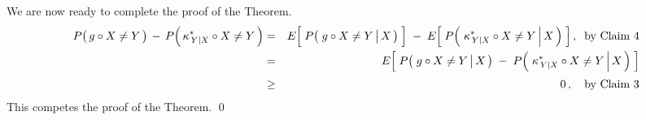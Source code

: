\vskip 0.8cm
\noindent
We are now ready to complete the proof of the Theorem.
\begin{eqnarray*}
P\!\left(\,g\overset{{\color{white}.}}{\circ}X \neq Y\,\right) \,-\, P\!\left(\,\kappa^{*}_{\,Y \vert X}\overset{{\color{white}.}}{\circ}X \neq Y\,\right)
&=&
	E\!\left[\;\overset{{\color{white}.}}{P}\!\left(\,\left. g \overset{{\color{white}.}}{\circ} X \neq Y \,\right\vert X \,\right)\;\right]
	\; - \;
	E\!\left[\;\overset{{\color{white}.}}{P}\!\left(\,\left. \kappa^{*}_{\,Y \vert X} \overset{{\color{white}.}}{\circ} X \neq Y \,\right\vert X \,\right)\;\right],
	\;\;\textnormal{by Claim 4}
\\
&=&
	E\!\left[\;
		\overset{{\color{white}.}}{P}\!\left(\,\left. g \overset{{\color{white}.}}{\circ} X \neq Y \,\right\vert X \,\right)
		\; - \;
		\overset{{\color{white}.}}{P}\!\left(\,\left. \kappa^{*}_{\,Y \vert X} \overset{{\color{white}.}}{\circ} X \neq Y \,\right\vert X \,\right)
	\;\right]
\\
&\overset{{\color{white}.}}{\geq}&
	0\,,
	\quad
	\textnormal{by Claim 3}
\end{eqnarray*}
This competes the proof of the Theorem.
\qed


\renewcommand{\theenumi}{\roman{enumi}}
\renewcommand{\labelenumi}{\textnormal{(\theenumi)}$\;\;$}


